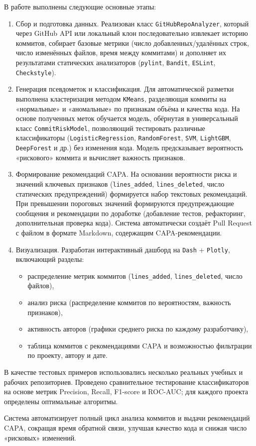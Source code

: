 {	В работе выполнены следующие основные этапы:
\begin{enumerate}
	\item Сбор и подготовка данных. Реализован класс \texttt{GitHubRepoAnalyzer}, который через GitHub API или локальный клон последовательно извлекает историю коммитов, собирает базовые метрики (число добавленных/удалённых строк, число изменённых файлов, время между коммитами) и дополняет их результатами статических анализаторов (\texttt{pylint}, \texttt{Bandit}, \texttt{ESLint}, \texttt{Checkstyle}).
	\item Генерация псевдометок и классификация. Для автоматической разметки выполнена кластеризация методом \texttt{KMeans}, разделяющая коммиты на «нормальные» и «аномальные» по признакам объёма и качества кода. На основе полученных меток обучается модель, обёрнутая в универсальный класс \texttt{CommitRiskModel}, позволяющий тестировать различные классификаторы (\texttt{LogisticRegression}, \texttt{RandomForest}, \texttt{SVM}, \texttt{LightGBM}, \texttt{DeepForest} и др.) без изменения кода. Модель предсказывает вероятность «рискового» коммита и вычисляет важность признаков.
	\item Формирование рекомендаций CAPA. На основании вероятности риска и значений ключевых признаков (\texttt{lines\_added}, \texttt{lines\_deleted}, число статических предупреждений) формируется набор текстовых рекомендаций. При превышении пороговых значений формируются предупреждающие сообщения и рекомендации по доработке (добавление тестов, рефакторинг, дополнительная проверка кода). Система автоматически создаёт Pull Request с файлом в формате Markdown, содержащим CAPA-рекомендации.
	\item Визуализация. Разработан интерактивный дашборд на \texttt{Dash} + \texttt{Plotly}, включающий разделы:
	\begin{itemize}
		\item распределение метрик коммитов (\texttt{lines\_added}, \texttt{lines\_deleted}, число файлов),
		\item анализ риска (распределение коммитов по вероятностям, важность признаков),
		\item активность авторов (графики среднего риска по каждому разработчику),
		\item таблица коммитов с рекомендациями CAPA и возможностью фильтрации по проекту, автору и дате.
	\end{itemize}
\end{enumerate}
	
	В качестве тестовых примеров использовались несколько реальных учебных и рабочих репозиториев. Проведено сравнительное тестирование классификаторов на основе метрик Precision, Recall, F1-score и ROC-AUC; для каждого проекта определены оптимальные алгоритмы.  
	
	Система автоматизирует полный цикл анализа коммитов и выдачи рекомендаций CAPA, сокращая время обратной связи, улучшая качество кода и снижая число «рисковых» изменений.}%
